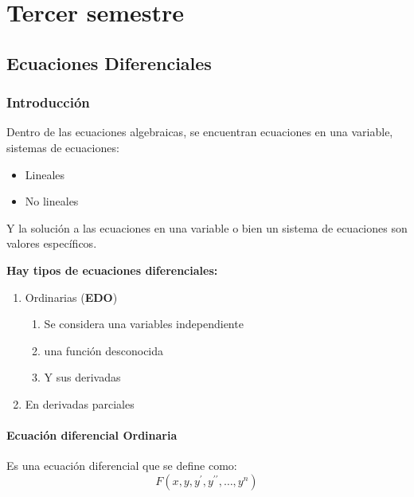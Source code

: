 \part{Tercer semestre}

\chapter{Ecuaciones Diferenciales}

\section{Introducción}

Dentro de las ecuaciones algebraicas, se encuentran ecuaciones en una variable,
sistemas de ecuaciones: 

\begin{itemize}
    \item Lineales
    \item No lineales
\end{itemize}

Y la solución a las ecuaciones en una variable o bien un sistema de ecuaciones son valores específicos.

\textbf{Hay tipos de ecuaciones diferenciales:}

\begin{enumerate}
    \item Ordinarias (\textbf{EDO})
    \begin{enumerate}
        \item Se considera una variables independiente
        \item una función desconocida
        \item Y sus derivadas
    \end{enumerate}
    \item En derivadas parciales
\end{enumerate}

\subsection{Ecuación diferencial Ordinaria}

\begin{definition}
    Es una ecuación diferencial que se define como:
    \begin{equation}
        F\left(x,y,y^{\prime},y^{\prime\prime},\dots,y^{n}\right)
    \end{equation}
\end{definition}

